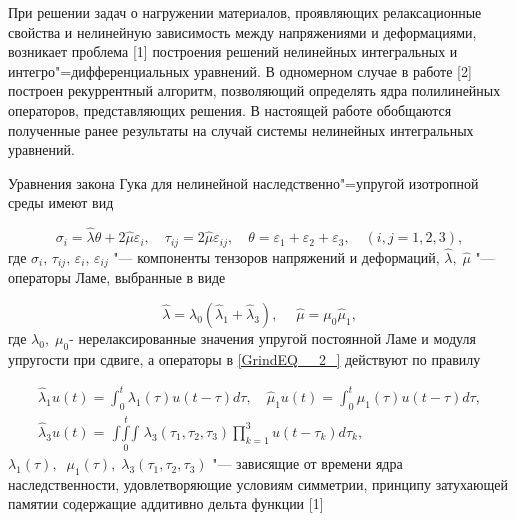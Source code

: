 \vzmscaption



При решении задач о нагружении материалов, проявляющих релаксационные свойства и нелинейную зависимость между напряжениями и деформациями, возникает проблема [1] построения решений  нелинейных интегральных и интегро"=дифференциальных уравнений. В одномерном случае в работе [2] построен рекуррентный алгоритм, позволяющий определять ядра полилинейных операторов, представляющих решения. В настоящей работе обобщаются полученные ранее результаты на случай системы нелинейных интегральных уравнений.

Уравнения закона Гука для нелинейной наследственно"=упругой изотропной среды имеют вид

\begin{equation} \label{GrindEQ__1_}
\sigma _{i} =\hat{\lambda }\theta +2\hat{\mu }\varepsilon _{i} ,\quad \tau _{ij} =2\hat{\mu }\varepsilon _{ij} ,\quad \theta =\varepsilon _{1} +\varepsilon _{2} +\varepsilon _{3} ,\quad (i,j=1,2,3), \end{equation}
где $\sigma _{i} ,\, \tau _{ij} ,\, \varepsilon _{i} ,\, \varepsilon _{ij} $ "--- компоненты тензоров напряжений и деформаций, $\hat{\lambda },\; \hat{\mu }$ "--- операторы Ламе, выбранные в виде

\begin{equation} \label{GrindEQ__2_} \hat{\lambda }=\lambda _{0} (\hat{\lambda }_{1} +\hat{\lambda }_{3} ),\quad \; \hat{\mu }=\mu _{0} \hat{\mu }_{1} , \end{equation}
где $\lambda _{0} ,\; \mu _{0} $- нерелаксированные значения упругой постоянной Ламе и модуля упругости при сдвиге, а операторы в \eqref{GrindEQ__2_} действуют по правилу

\begin{equation} \label{GrindEQ__3_} \begin{array}{l} {\hat{\lambda }_{1} u(t)=\int _{0}^{t}\lambda _{1}  (\tau )u(t-\tau )d\tau ,\quad \hat{\mu }_{1} u(t)=\int _{0}^{t}\mu _{1}  (\tau )u(t-\tau )d\tau ,} \\ {\hat{\lambda }_{3} u(t)=\mathop{\int \int \int    }\limits_{0}^{t} \lambda _{3} (\tau _{1} ,\tau _{2} ,\tau _{3} )\prod _{k=1}^{3}u(t-\tau _{k} )d\tau _{k}  ,} \end{array} \end{equation}
$\lambda _{1} (\tau ),\; \; \mu _{1} (\tau ),\; \lambda _{3} (\tau _{1} ,\tau _{2} ,\tau _{3} )$ "--- зависящие от времени ядра наследственности, удовлетворяющие условиям симметрии, принципу затухающей памятии содержащие аддитивно дельта функции [1]

